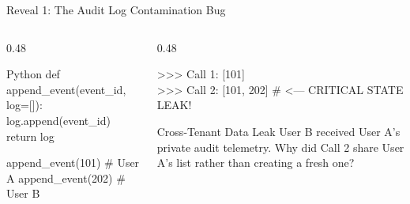 \begin{frame}[fragile]{Reveal 1: The Audit Log Contamination Bug}
  \begin{columns}[T,onlytextwidth]
    \begin{column}{0.48\textwidth}
      \begin{CodeBlock}{Python}
def append_event(event_id, log=[]):
    log.append(event_id)
    return log

append_event(101)  # User A
append_event(202)  # User B
      \end{CodeBlock}
    \end{column}
    \begin{column}{0.48\textwidth}
      \begin{TerminalWindow}
>>> Call 1: [101] \\
>>> Call 2: [101, 202]  \# <--- CRITICAL STATE LEAK!
      \end{TerminalWindow}
      \vspace{0.08cm}
      \begin{WarningBox}{Cross-Tenant Data Leak}
        \scriptsize User B received User A's private audit telemetry. Why did Call 2 share User A's list rather than creating a fresh one?
      \end{WarningBox}
    \end{column}
  \end{columns}
  \vspace{0.08cm}
\end{frame}

